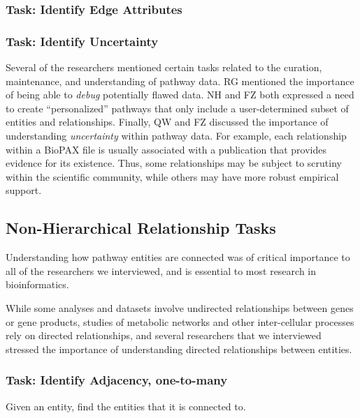 \documentclass{egpubl}
\begin{document}
\subsubsection{Task: Identify Edge Attributes}
\subsubsection{Task: Identify Uncertainty}
Several of the researchers mentioned certain tasks related to the curation, maintenance, and understanding of pathway data. RG mentioned the importance of being able to \emph{debug} potentially flawed data. NH and FZ both expressed a need to create ``personalized'' pathways that only include a user-determined subset of entities and relationships. Finally, QW and FZ discussed the importance of understanding \emph{uncertainty} within pathway data. For example, each relationship within a BioPAX file is usually associated with a publication that provides evidence for its existence. Thus, some relationships may be subject to scrutiny within the scientific community, while others may have more robust empirical support.


\subsection{Non-Hierarchical Relationship Tasks}

Understanding how pathway entities are connected was of critical importance to all of the researchers we interviewed, and is essential to most research in bioinformatics.

While some analyses and datasets involve undirected relationships between genes or gene products, studies of metabolic networks and other inter-cellular processes rely on directed relationships, and several researchers that we interviewed stressed the importance of understanding directed relationships between entities.

\subsubsection{Task: Identify Adjacency, one-to-many}
Given an entity, find the entities that it is connected to.
\end{document}
